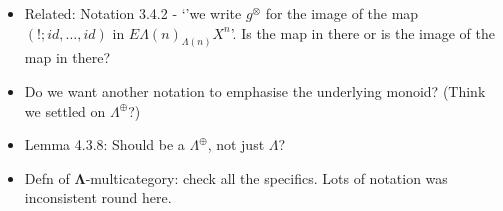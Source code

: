 \documentclass{amsart}
\begin{document}
\begin{itemize}
\item Related: Notation 3.4.2 - `'we write $g^\otimes$ for the image of the map $(!;id,\ldots,id)$ in $E\Lambda(n)_{\Lambda(n)}X^n$'. Is the map in there or is the image of the map in there?
\item Do we want another notation to emphasise the underlying monoid? (Think we settled on $\Lambda^{\oplus}$?)
\item Lemma 4.3.8: Should be a $\Lambda^{\oplus}$, not just $\Lambda$?
\item Defn of $\mathbf{\Lambda}$-multicategory: check all the specifics. Lots of notation was inconsistent round here.
\end{itemize}
\end{document}
